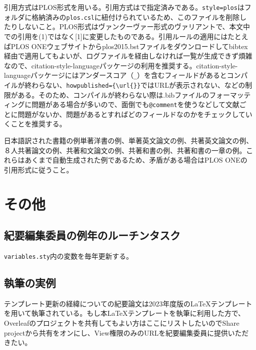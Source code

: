 \documentclass[fontsize=9pt, jafontscale=.95, twocolumn, a4paper]{jlreq}
\begin{document}
引用方式はPLOS形式を用いる。引用方式は\texttt{}で指定済みである。\verb|style=plos|はフォルダに格納済みの\verb|plos.csl|に紐付けられているため、このファイルを削除したりしないこと。PLOS形式はヴァンクーヴァー形式のヴァリアントで、本文中での引用を(1)ではなく[1]に変更したものである。引用ルールの適用にはたとえばPLOS ONEウェブサイト\cite{Plos_undated-wc}からplos2015.bstファイルをダウンロードしてbibtex経由で適用してもよいが、ログファイルを経由しなければ一覧が生成できず煩雑なので、citation-style-languageパッケージの利用を推奨する。citation-style-languageパッケージにはアンダースコア（\verb|_|）を含むフィールドがあるとコンパイルが終わらない、\verb|howpublished={\url{}}|ではURLが表示されない、などの制限がある。そのため、コンパイルが終わらない際は.bibファイルのフォーマッティングに問題がある場合が多いので、面倒でも\texttt{@comment{}}を使うなどして文献ごとに問題がないか、問題があるとすればどのフィールドなのかをチェックしていくことを推奨する。

日本語訳された書籍の例\cite{2019-yk}単著洋書の例\cite{Dawkins2006-fw, Dennett2017-xz}、単著英文論文の例\cite{Tehrani2013-dy}、共著英文論文の例\cite{Henrich2008-lq}、８人共著論文の例\cite{Cooney2017-yt}、共著和文論文の例\cite{2012-zr}、共著和書の例\cite{2012-dp}、共著和書の一章の例\cite{2017-dc}。これらはあくまで自動生成された例であるため、矛盾がある場合はPLOS ONEの引用形式\cite{Plos_undated-yh}に従うこと。

\section{その他}

\subsection*{紀要編集委員の例年のルーチンタスク}
\verb|variables.sty|内の変数を毎年更新する。
\subsection*{執筆の実例}

テンプレート更新の経緯についての紀要論文\cite{2024-oz}は2023年度版のLaTeXテンプレートを用いて執筆されている\cite{Matsui2023-px}。もし本LaTeXテンプレートを執筆に利用した方で、Overleafのプロジェクトを共有してもよい方はここにリストしたいのでShare projectから共有をオンにし、View権限のみのURLを紀要編集委員に提供いただきたい。
\end{document}
